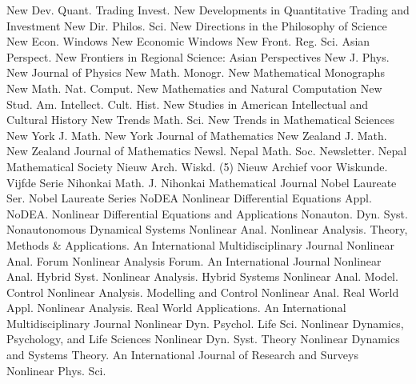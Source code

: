 {New Dev. Quant. Trading Invest.}
{New Developments in Quantitative Trading and Investment}
{New Dir. Philos. Sci.}
{New Directions in the Philosophy of Science}
{New Econ. Windows}
{New Economic Windows}
{New Front. Reg. Sci. Asian Perspect.}
{New Frontiers in Regional Science: Asian Perspectives}
{New J. Phys.}
{New Journal of Physics}
{New Math. Monogr.}
{New Mathematical Monographs}
{New Math. Nat. Comput.}
{New Mathematics and Natural Computation}
{New Stud. Am. Intellect. Cult. Hist.}
{New Studies in American Intellectual and Cultural History}
{New Trends Math. Sci.}
{New Trends in Mathematical Sciences}
{New York J. Math.}
{New York Journal of Mathematics}
{New Zealand J. Math.}
{New Zealand Journal of Mathematics}
{Newsl. Nepal Math. Soc.}
{Newsletter. Nepal Mathematical Society}
{Nieuw Arch. Wiskd. (5)}
{Nieuw Archief voor Wiskunde. Vijfde Serie}
{Nihonkai Math. J.}
{Nihonkai Mathematical Journal}
{Nobel Laureate Ser.}
{Nobel Laureate Series}
{NoDEA Nonlinear Differential Equations Appl.}
{NoDEA. Nonlinear Differential Equations and Applications}
{Nonauton. Dyn. Syst.}
{Nonautonomous Dynamical Systems}
{Nonlinear Anal.}
{Nonlinear Analysis. Theory, Methods & Applications. An International Multidisciplinary Journal}
{Nonlinear Anal. Forum}
{Nonlinear Analysis Forum. An International Journal}
{Nonlinear Anal. Hybrid Syst.}
{Nonlinear Analysis. Hybrid Systems}
{Nonlinear Anal. Model. Control}
{Nonlinear Analysis. Modelling and Control}
{Nonlinear Anal. Real World Appl.}
{Nonlinear Analysis. Real World Applications. An International Multidisciplinary Journal}
{Nonlinear Dyn. Psychol. Life Sci.}
{Nonlinear Dynamics, Psychology, and Life Sciences}
{Nonlinear Dyn. Syst. Theory}
{Nonlinear Dynamics and Systems Theory. An International Journal of Research and Surveys}
{Nonlinear Phys. Sci.}
